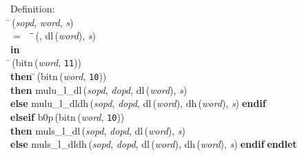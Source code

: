 \begin{tabbing}{\sc Definition}: \\  
\=\,({\it{sopd\/}}, {\it{word\/}}, {\it{s\/}}) \\ 
$=$$\;\;\;\;$\=\=\,({}, {\rm{dl}}\,({\it{word\/}}), {\it{s\/}})\- \\ 
{\bf in} \\ 
\=\,({\rm{bitn}}\,({\it{word\/}}, {\tt{11}})) \\ 
{\bf then }\=\,({\rm{bitn}}\,({\it{word\/}}, {\tt{10}})) \\ 
{\bf then }{\rm{mulu\_l\_dl}}\,({\it{sopd\/}}, {\it{dopd\/}}, {\rm{dl}}\,({\it{word\/}}), {\it{s\/}}) \\ 
{\bf else }{\rm{mulu\_l\_dldh}}\,({\it{sopd\/}}, {\it{dopd\/}}, {\rm{dl}}\,({\it{word\/}}), {\rm{dh}}\,({\it{word\/}}), {\it{s\/}})$\;${\bf  endif}\- \\ 
{\bf elseif }{\rm{b0p}}\,({\rm{bitn}}\,({\it{word\/}}, {\tt{10}})) \\ 
{\bf then }{\rm{muls\_l\_dl}}\,({\it{sopd\/}}, {\it{dopd\/}}, {\rm{dl}}\,({\it{word\/}}), {\it{s\/}}) \\ 
{\bf else }{\rm{muls\_l\_dldh}}\,({\it{sopd\/}}, {\it{dopd\/}}, {\rm{dl}}\,({\it{word\/}}), {\rm{dh}}\,({\it{word\/}}), {\it{s\/}})$\;${\bf  endif}\-$\;${\bf  endlet}\-\-
\end{tabbing}

